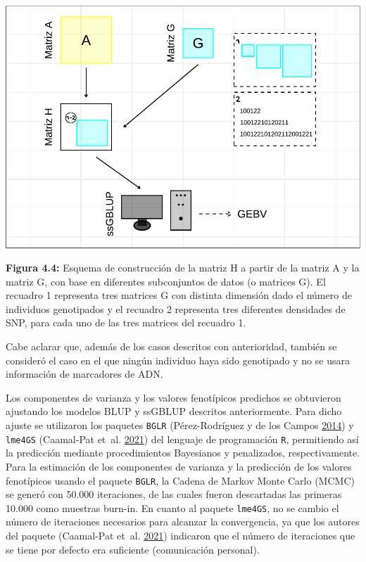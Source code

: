 \documentclass[11pt,spanish,a4paper,oneside,]{book} %
\begin{document}
\begin{center}\includegraphics[width=1\linewidth]{figures/Esquema_1} \end{center}

\begin{center}
\textbf{Figura 4.4:} Esquema de construcción de la matriz H a partir de la matriz A y la matriz G, con base en diferentes subconjuntos de datos (o matrices G). El recuadro 1 representa tres matrices G con distinta dimensión dado el número de individuos genotipados y el recuadro 2 representa tres diferentes densidades de SNP, para cada uno de las tres matrices del recuadro 1.

\end{center}

Cabe aclarar que, además de los casos descritos con anterioridad, también se consideró el caso en el que ningún individuo haya sido genotipado y no se usara información de marcadores de ADN.

Los componentes de varianza y los valores fenotípicos predichos se obtuvieron ajustando los modelos BLUP y ssGBLUP descritos anteriormente. Para dicho ajuste se utilizaron los paquetes \texttt{BGLR} (Pérez-Rodríguez y de los Campos \protect\hyperlink{ref-cite:50}{2014}) y \texttt{lme4GS} (Caamal-Pat et~al. \protect\hyperlink{ref-cite:51}{2021}) del lenguaje de programación \texttt{R}, permitiendo así la predicción mediante procedimientos Bayesianos y penalizados, respectivamente. Para la estimación de los componentes de varianza y la predicción de los valores fenotípicos usando el paquete \texttt{BGLR}, la Cadena de Markov Monte Carlo (MCMC) se generó con 50.000 iteraciones, de las cuales fueron descartadas las primeras 10.000 como muestras burn-in. En cuanto al paquete \texttt{lme4GS}, no se cambio el número de iteraciones necesarios para alcanzar la convergencia, ya que los autores del paquete (Caamal-Pat et~al. \protect\hyperlink{ref-cite:51}{2021}) indicaron que el número de iteraciones que se tiene por defecto era suficiente (comunicación personal).
\end{document}
